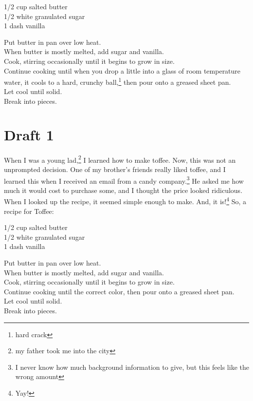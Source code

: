 \documentclass[12pt]{article}[titlepage]
\newcommand{\1}{\={a}}
\newcommand{\2}{\={e}}
\newcommand{\3}{\={\i}}
\newcommand{\4}{\=o}
\newcommand{\5}{\=u}
\newcommand{\6}{\={A}}
\renewcommand{\,}{\textsuperscript{,}}
\begin{document}
1/2 cup salted butter\\
1/2 white granulated sugar\\
1 dash vanilla

Put butter in pan over low heat.\\
When butter is mostly melted, add sugar and vanilla.\\
Cook, stirring occasionally until it begins to grow in size.\\
Continue cooking until when you drop a little into a glass of room temperature water, it cools to a hard, crunchy ball,\footnote{hard crack} then pour onto a greased sheet pan.\\
Let cool until solid.\\
Break into pieces.

\section{Draft 1}
When I was a young lad,\footnote{my father took me into the city} I learned how to make toffee.
Now, this was not an unprompted decision.
One of my brother's friends really liked toffee, and I learned this when I received an email from a candy company.\footnote{I never know how much background information to give, but this feels like the wrong amount}
He asked me how much it would cost to purchase some, and I thought the price looked ridiculous.
When I looked up the recipe, it seemed simple enough to make.
And, it is!\footnote{Yay!}
So, a recipe for Toffee:

1/2 cup salted butter\\
1/2 white granulated sugar\\
1 dash vanilla

Put butter in pan over low heat.\\
When butter is mostly melted, add sugar and vanilla.\\
Cook, stirring occasionally until it begins to grow in size.\\
Continue cooking until the correct color, then pour onto a greased sheet pan.\\
Let cool until solid.\\
Break into pieces.
\end{document}
